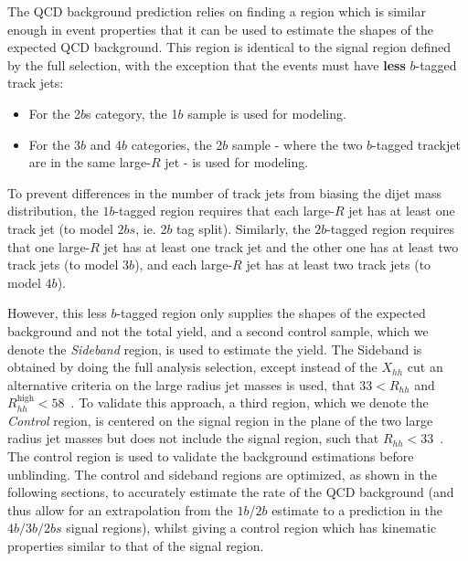 The QCD background prediction relies on finding a region which is similar enough in event properties that it can be used to estimate the shapes of the expected QCD background.  This region is identical to the signal region defined by the full selection, with the exception that the events must have \textbf{less} $b$-tagged track jets:
\begin{itemize}
\item For the 2$b$s category, the 1$b$ sample is used for modeling.
\item For the 3$b$ and 4$b$ categories, the 2$b$ sample - where the two $b$-tagged trackjet are in the same large-$R$ jet - is used for modeling.
\end{itemize}
To prevent differences in the number of track jets from biasing the dijet mass distribution, the $1b$-tagged region requires that each large-$R$ jet has at least one track jet (to model $2bs$, ie. 2$b$ tag split). Similarly, the $2b$-tagged region requires that one large-$R$ jet has at least one track jet and the other one has at least two track jets (to model $3b$), and each large-$R$ jet has at least two track jets (to model $4b$).

However, this less $b$-tagged region only supplies the shapes of the expected background and not the total yield, and a second control sample, which we denote the \textit{Sideband} region, is used to estimate the yield. The Sideband is obtained by doing the full analysis selection, except instead of the $X_{hh}$ cut an alternative criteria on the large radius jet masses is used, that $33 < R_{hh} $ and $R_{hh}^{\text{high}} < 58$~\GeV. To validate this approach, a third region, which we denote the \textit{Control} region, is centered on the signal region in the plane of the two large radius jet masses but does not include the signal region, such that $R_{hh} < 33$~\GeV.  The control region is used to validate the background estimations before unblinding. The control and sideband regions are optimized, as shown in the following sections, to accurately estimate the rate of the QCD background (and thus allow for an extrapolation from the $1b$/$2b$ estimate to a prediction in the $4b/3b/2bs$  signal regions), whilst giving a control region which has kinematic properties similar to that of the signal region. 







